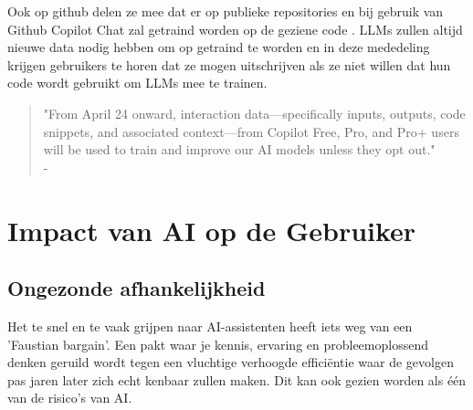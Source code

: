 Ook op github delen ze mee dat er op publieke repositories en bij gebruik van Github Copilot Chat zal getraind worden op de geziene code \autocite{Rodriguez2026}. LLMs zullen altijd nieuwe data nodig hebben om op getraind te worden en in deze mededeling krijgen gebruikers te horen dat ze mogen uitschrijven als ze niet willen dat hun code wordt gebruikt om LLMs mee te trainen.

\begin{quote}
    "From April 24 onward, interaction data—specifically inputs, outputs, code snippets, and associated context—from Copilot Free, Pro, and Pro+ users will be used to train and improve our AI models unless they opt out." \\
    -\autocite{Rodriguez2026}
\end{quote}




\section{Impact van AI op de Gebruiker}
\label{sec:impactvanaiopdegebruiker}
\subsection{Ongezonde afhankelijkheid}
\label{ssec:ongezondeafhankelijkheid}
Het te snel en te vaak grijpen naar AI-assistenten heeft iets weg van een 'Faustian bargain'. Een pakt waar je kennis, ervaring en probleemoplossend denken geruild wordt tegen een vluchtige verhoogde efficiëntie waar de gevolgen pas jaren later zich echt kenbaar zullen maken. Dit kan ook gezien worden als één van de risico's van AI.

